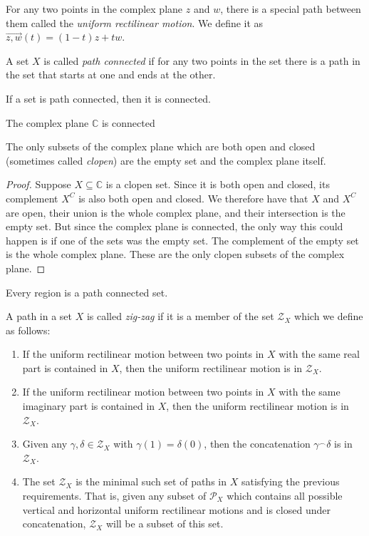 \begin{definition}
For any two points in the complex plane $z$ and $w$, there is a special path between them called the \emph{uniform rectilinear motion}. We define it as $\overrightarrow{z,w}(t)=(1-t)z+tw$.
\end{definition}
\begin{definition}
A set $X$ is called \emph{path connected} if for any two points in the set there is a path in the set that starts at one and ends at the other.
\end{definition}
\begin{theorem}
If a set is path connected, then it is connected.
\end{theorem}
\begin{corollary}
The complex plane $\mathbb{C}$ is connected
\end{corollary}
\begin{corollary}
The only subsets of the complex plane which are both open and closed (sometimes called \emph{clopen}) are the empty set and the complex plane itself.
\end{corollary}
\begin{proof}
Suppose $X \subseteq \mathbb{C}$ is a clopen set. Since it is both open and closed, its complement $X^C$ is also both open and closed. We therefore have that $X$ and $X^C$ are open, their union is the whole complex plane, and their intersection is the empty set. But since the complex plane is connected, the only way this could happen is if one of the sets was the empty set. The complement of the empty set is the whole complex plane.
These are the only clopen subsets of the complex plane.
\end{proof}
\begin{theorem}
Every region is a path connected set.
\end{theorem}
\begin{definition}
A path in a set $X$ is called \emph{zig-zag} if it is a member of the set $\mathcal{Z}_X$ which we define as follows:
\begin{enumerate}
\item If the uniform rectilinear motion between two points in $X$ with the same real part is contained in $X$, then the uniform rectilinear motion is in $\mathcal{Z}_X$.
\item If the uniform rectilinear motion between two points in $X$ with the same imaginary part is contained in $X$, then the uniform rectilinear motion is in $\mathcal{Z}_X$.
\item Given any $\gamma, \delta \in \mathcal{Z}_X$ with $\gamma(1)=\delta(0)$, then the concatenation $\gamma^\frown\delta$ is in $\mathcal{Z}_X$.
\item The set $\mathcal{Z}_X$ is the minimal such set of paths in $X$ satisfying the previous requirements. That is, given any subset of $\mathcal{P}_X$ which contains all possible vertical and horizontal uniform rectilinear motions and is closed under concatenation, $\mathcal{Z}_X$ will be a subset of this set.
\end{enumerate}
\end{definition}
